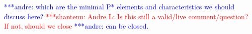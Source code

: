 \documentclass[conference,final]{IEEEtran}
\newcommand{\jhanote}[1]{ {\textcolor{red} { ***shantenu: #1 }}}
\newcommand{\alnote}[1]{ {\textcolor{blue} { ***andre: #1 }}}
\newcommand{\alnote}[1]{}
\newcommand{\jhanote}[1]{}
\begin{document}





\alnote{which are the minimal P* elements and characteristics we
  should discuss here?}  \jhanote{Andre L: Is this still a valid/live
  comment/question? If not, should we close}\alnote{can be closed.}
\end{document}
